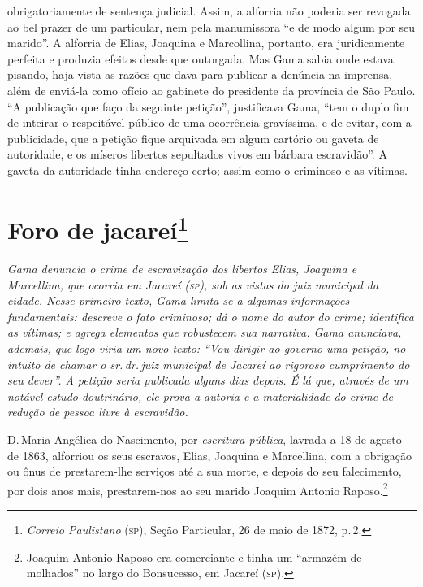 {obrigatoriamente de sentença judicial. Assim, a alforria não poderia ser
revogada ao bel prazer de um particular, nem pela manumissora ``e de modo
algum por seu marido''. A alforria de Elias, Joaquina e Marcollina,
portanto, era juridicamente perfeita e produzia efeitos desde que
outorgada. Mas Gama sabia onde estava pisando, haja vista as razões que
dava para publicar a denúncia na imprensa, além de enviá-la como ofício
ao gabinete do presidente da província de São Paulo. ``A publicação que
faço da seguinte petição'', justificava Gama, ``tem o duplo fim de
inteirar o respeitável público de uma ocorrência gravíssima, e de
evitar, com a publicidade, que a petição fique arquivada em algum
cartório ou gaveta de autoridade, e os míseros libertos sepultados vivos
em bárbara escravidão''. A gaveta da autoridade tinha endereço certo;
assim como o criminoso e as vítimas.}

\chapter{Foro de jacareí\footnote{\emph{Correio Paulistano} (\textsc{sp}), Seção Particular,
  26 de maio de 1872, p.\,2.}} %

\begin{didascalia}
\emph{Gama denuncia o crime de escravização dos libertos Elias, Joaquina
e Marcellina, que ocorria em Jacareí (\textsc{sp}), sob as vistas do juiz
municipal da cidade. Nesse primeiro texto, Gama limita-se a algumas
informações fundamentais: descreve o fato criminoso; dá o nome do autor
do crime; identifica as vítimas; e agrega elementos que robustecem sua
narrativa. Gama anunciava, ademais, que logo viria um novo texto: ``Vou
dirigir ao governo uma petição, no intuito de chamar o sr.\,dr.\,juiz
municipal de Jacareí ao rigoroso cumprimento do seu dever''. A petição
seria publicada alguns dias depois. É lá que, através de um notável
estudo doutrinário, ele prova a autoria e a materialidade do crime de
redução de pessoa livre à escravidão.}
\end{didascalia}

D.\,Maria Angélica do Nascimento, por \emph{escritura pública}, lavrada a
18 de agosto de 1863, alforriou os seus escravos, Elias, Joaquina e
Marcellina, com a obrigação ou ônus de prestarem-lhe serviços até a sua
morte, e depois do seu falecimento, por dois anos mais, prestarem-nos ao
seu marido Joaquim Antonio Raposo.\footnote{ Joaquim Antonio Raposo era
  comerciante e tinha um ``armazém de molhados'' no largo do Bonsucesso,
  em Jacareí (\textsc{sp}).}

